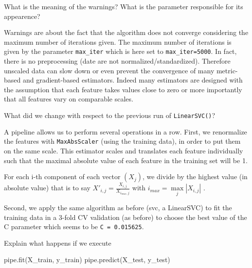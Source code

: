 \documentclass[10pt,a4paper]{article}
\newenvironment{Shaded}{\begin{snugshade}}{\end{snugshade}}
\newcommand{\NormalTok}[1]{#1}
\theoremstyle{break}
\begin{document}
\begin{tcolorbox}

What is the meaning of the warnings? What is the parameter responsible for its appearence?

\end{tcolorbox}

Warnings are about the fact that the algorithm does not converge considering the maximum number of iterations given. The maximum number of iterations is given by the parameter \texttt{max\_iter} which is here set to \texttt{max\_iter=5000}.
In fact, there is no preprocessing (date are not normalized/standardized). Therefore unscaled data can slow down or even prevent the convergence of many metric-based and gradient-based estimators. Indeed many estimators are designed with the assumption that each feature takes values close to zero or more importantly that all features vary on comparable scales.

\begin{tcolorbox}

What did we change with respect to the previous run of \texttt{LinearSVC()}?

\end{tcolorbox}

A pipeline allows us to perform several operations in a row. First, we renormalize the features with \texttt{MaxAbsScaler} (using the training data), in order to put them on the same scale.
This estimator scales and translates each feature individually such that the maximal absolute value of each feature in the training set will be 1.

For each i-th component of each vector \((X_j)\), we divide by the highest value (in absolute value) that is to say \(X'_{i,j}=\frac{X_{i,j}}{X_{i_{max},j}}\) with \(i_{max}= \underset{j}{\max}|X_{i,j}|\) .

Second, we apply the same algorithm as before (svc, a LinearSVC) to fit the training data in a 3-fold CV validation (as before) to choose the best value of the C parameter which seems to be \texttt{C\ =\ 0.015625}.

\begin{tcolorbox}

Explain what happens if we execute

\begin{Shaded}
\begin{Highlighting}[]
\NormalTok{    pipe.fit(X_train, y_train)}
\NormalTok{    pipe.predict(X_test, y_test)}
\end{Highlighting}
\end{Shaded}

\end{tcolorbox}
\end{document}
